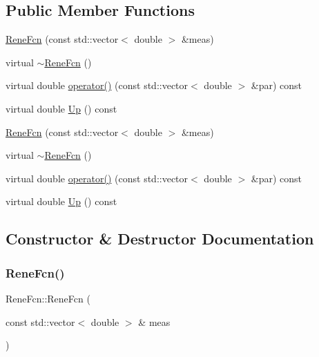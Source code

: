 \subsection*{Public Member Functions}
\begin{DoxyCompactItemize}
\item 
\mbox{\hyperlink{classReneFcn_a6266b3646d9ddb228049b3584ca16758}{Rene\+Fcn}} (const std\+::vector$<$ double $>$ \&meas)
\item 
virtual \mbox{\hyperlink{classReneFcn_ab68c421be2378b7547452626cb7ec874}{$\sim$\+Rene\+Fcn}} ()
\item 
virtual double \mbox{\hyperlink{classReneFcn_a717a787ca09d586430bf5dc1d51b7ab1}{operator()}} (const std\+::vector$<$ double $>$ \&par) const
\item 
virtual double \mbox{\hyperlink{classReneFcn_a5e7e439a47c37d673d9366918c74239c}{Up}} () const
\item 
\mbox{\hyperlink{classReneFcn_a6266b3646d9ddb228049b3584ca16758}{Rene\+Fcn}} (const std\+::vector$<$ double $>$ \&meas)
\item 
virtual \mbox{\hyperlink{classReneFcn_ab68c421be2378b7547452626cb7ec874}{$\sim$\+Rene\+Fcn}} ()
\item 
virtual double \mbox{\hyperlink{classReneFcn_a717a787ca09d586430bf5dc1d51b7ab1}{operator()}} (const std\+::vector$<$ double $>$ \&par) const
\item 
virtual double \mbox{\hyperlink{classReneFcn_a5e7e439a47c37d673d9366918c74239c}{Up}} () const
\end{DoxyCompactItemize}


\subsection{Constructor \& Destructor Documentation}
\mbox{\label{classReneFcn_a6266b3646d9ddb228049b3584ca16758}} 
\subsubsection{\texorpdfstring{ReneFcn()}{ReneFcn()}\hspace{0.1cm}{\footnotesize\ttfamily [1/2]}}
{\footnotesize\ttfamily Rene\+Fcn\+::\+Rene\+Fcn (\begin{DoxyParamCaption}\item[{const std\+::vector$<$ double $>$ \&}]{meas }\end{DoxyParamCaption})\hspace{0.3cm}{\ttfamily [inline]}}

